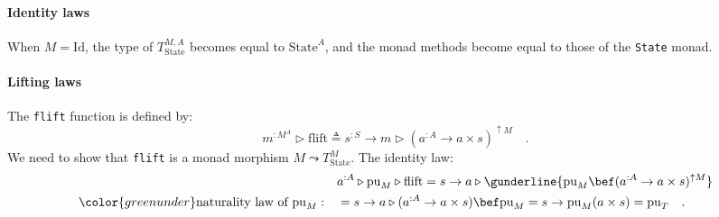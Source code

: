 \paragraph{Identity laws}

When $M=\text{Id}$, the type of $T_{\text{State}}^{M,A}$ becomes
equal to $\text{State}^{A}$, and the monad methods become equal to
those of the \lstinline!State! monad.

\paragraph{Lifting laws}

The \lstinline!flift! function is defined by:
\begin{equation}
m^{:M^{A}}\triangleright\text{flift}\triangleq s^{:S}\rightarrow m\triangleright(a^{:A}\rightarrow a\times s)^{\uparrow M}\quad.\label{eq:state-transformer-def-of-flift}
\end{equation}
We need to show that \lstinline!flift! is a monad morphism $M\leadsto T_{\text{State}}^{M}$.
The identity law:
\begin{align*}
 & a^{:A}\triangleright\text{pu}_{M}\triangleright\text{flift}=s\rightarrow a\triangleright\gunderline{\text{pu}_{M}\bef(a^{:A}\rightarrow a\times s)^{\uparrow M}}\\
{\color{greenunder}\text{naturality law of }\text{pu}_{M}:}\quad & =s\rightarrow a\triangleright(a^{:A}\rightarrow a\times s)\bef\text{pu}_{M}=s\rightarrow\text{pu}_{M}(a\times s)=\text{pu}_{T}\quad.
\end{align*}

